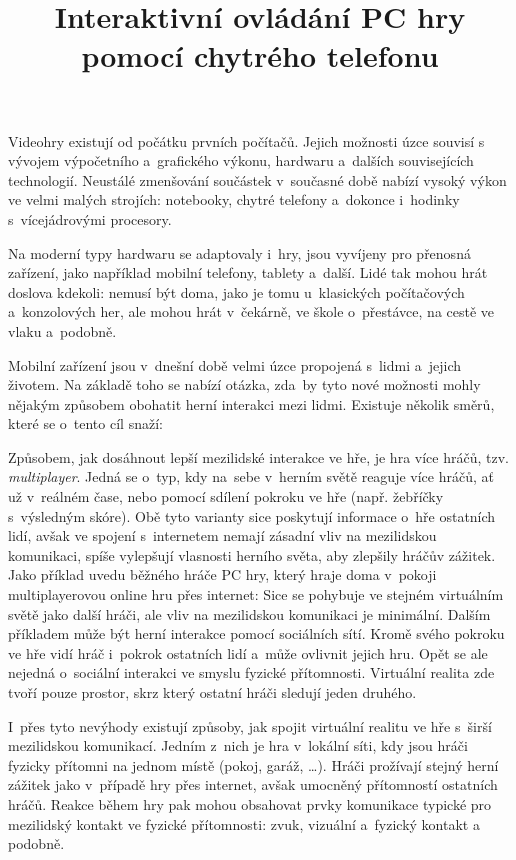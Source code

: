 \documentclass[thesis=B,czech,hidelinks]{FITthesis}[2012/06/26] %
\title{Interaktivn{\' i} ovl{\' a}d{\' a}n{\' i} PC hry pomoc{\' i} chytr{\' e}ho telefonu}
\begin{document}
 

\begin{introduction}
Videohry existují od počátku prvních počítačů. \cite{rylich} Jejich možnosti úzce souvisí s vývojem výpočetního a~grafického výkonu, hardwaru a~dalších souvisejících technologií. Neustálé zmenšování součástek v~současné době nabízí vysoký výkon ve velmi malých strojích: notebooky, chytré telefony a~dokonce i~hodinky s~vícejádrovými procesory. \cite{kupi}

Na moderní typy hardwaru se adaptovaly i~hry, jsou vyvíjeny pro přenosná zařízení, jako například mobilní telefony, tablety a~další. Lidé tak mohou hrát doslova kdekoli: nemusí být doma, jako je tomu u~klasických počítačových a~konzolových her, ale mohou hrát v~čekárně, ve škole o~přestávce, na cestě ve vlaku a~podobně.

Mobilní zařízení jsou v~dnešní době velmi úzce propojená s~lidmi a~jejich životem. Na základě toho se nabízí otázka, zda~by tyto nové možnosti mohly nějakým způsobem obohatit herní interakci mezi lidmi. Existuje několik směrů, které se o~tento cíl snaží:

Způsobem, jak dosáhnout lepší mezilidské interakce ve hře, je hra více hráčů, tzv. \textit{multiplayer}. Jedná se o~typ, kdy na~sebe v~herním světě reaguje více hráčů, ať už v~reálném čase, nebo pomocí sdílení pokroku ve hře (např. žebříčky s~výsledným skóre). Obě tyto varianty sice poskytují informace o~hře ostatních lidí, avšak ve spojení s~internetem nemají zásadní vliv na mezilidskou komunikaci, spíše vylepšují vlasnosti herního světa, aby zlepšily hráčův zážitek. Jako příklad uvedu běžného hráče PC hry, který hraje doma v~pokoji multiplayerovou online hru přes internet: Sice se pohybuje ve stejném virtuálním světě jako další hráči, ale vliv na mezilidskou komunikaci je minimální. Dalším příkladem může být herní interakce pomocí sociálních sítí. Kromě svého pokroku ve hře vidí hráč i~pokrok ostatních lidí a~může ovlivnit jejich hru. Opět se ale nejedná o~sociální interakci ve smyslu fyzické přítomnosti. Virtuální realita zde tvoří pouze prostor, skrz který ostatní hráči sledují jeden druhého.

I~přes tyto nevýhody existují způsoby, jak spojit virtuální realitu ve hře s~širší mezilidskou komunikací. Jedním z~nich je hra v~lokální síti, kdy jsou hráči fyzicky přítomni na jednom místě (pokoj, garáž, …). Hráči prožívají stejný herní zážitek jako v~případě hry přes internet, avšak umocněný přítomností ostatních hráčů. Reakce během hry pak mohou obsahovat prvky komunikace typické pro mezilidský kontakt ve fyzické přítomnosti: zvuk, vizuální a~fyzický kontakt a podobně.


\end{introduction}
\end{document}
